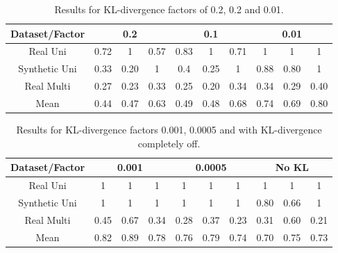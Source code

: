 \bgroup
\def\arraystretch{1.8}
\begin{table}[htbp]
\centering
\begin{tabular}{|c|c|c|c|c|c|c|c|c|c|}
\hline
Dataset/Factor & \multicolumn{3}{c|}{0.2} & \multicolumn{3}{c|}{0.1} & \multicolumn{3}{c|}{0.01} \\ \hline
Real Uni       & 0.72   & 1      & 0.57   & 0.83   & 1      & 0.71   & 1       & 1      & 1      \\ \hline
Synthetic Uni  & 0.33   & 0.20   & 1      & 0.4    & 0.25   & 1      & 0.88    & 0.80   & 1      \\ \hline
Real Multi     & 0.27   & 0.23   & 0.33   & 0.25   & 0.20   & 0.34   & 0.34    & 0.29   & 0.40   \\ \hline
Mean           & 0.44   & 0.47   & 0.63   & 0.49   & 0.48   & 0.68   & 0.74    & 0.69   & 0.80   \\ \hline
\end{tabular}
\caption{Results for KL-divergence factors of 0.2, 0.2 and 0.01.}
\label{tab:kl_001}
\end{table}
\egroup

\bgroup
\def\arraystretch{1.8}
\begin{table}[htbp]
\centering
\begin{tabular}{|c|c|c|c|c|c|c|c|c|c|}
\hline
Dataset/Factor & \multicolumn{3}{c|}{0.001} & \multicolumn{3}{c|}{0.0005} & \multicolumn{3}{c|}{No KL} \\ \hline
Real Uni       & 1       & 1       & 1      & 1       & 1       & 1       & 1       & 1       & 1      \\ \hline
Synthetic Uni  & 1       & 1       & 1      & 1       & 1       & 1       & 0.80    & 0.66    & 1      \\ \hline
Real Multi     & 0.45    & 0.67    & 0.34   & 0.28    & 0.37    & 0.23    & 0.31    & 0.60    & 0.21   \\ \hline
Mean           & 0.82    & 0.89    & 0.78   & 0.76    & 0.79    & 0.74    & 0.70    & 0.75    & 0.73   \\ \hline
\end{tabular}
\caption{Results for KL-divergence factors 0.001, 0.0005 and with KL-divergence completely off.}
\label{tab:kl_no}
\end{table}
\egroup



